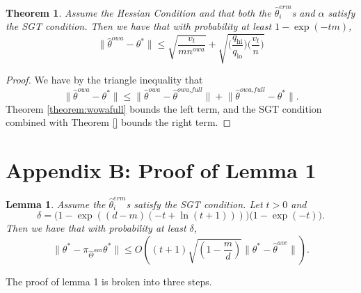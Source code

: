 \documentclass[twoside]{article}
\newtheorem{theorem}{Theorem}
\newtheorem{lemma}{Lemma}
\newcommand{\smin}{s_\text{min}}
\newcommand{\smax}{s_\text{max}}
\newcommand{\qhi}{q_\text{hi}}
\newcommand{\qlo}{q_\text{lo}}
\newcommand{\nowa}{n^{\textit{owa}}}
\newcommand{\W}{{\hat \Theta^{\textit{owa}}}}
\newcommand{\w}{\theta}
\newcommand{\wowa}{\hat\w^{owa}}
\newcommand{\wowafull}{\hat\w^{\textit{owa,full}}}
\newcommand{\wave}{\hat\w^{ave}}
\newcommand{\wmle}{\hat\w^{erm}}
\newcommand{\wstar}{{\w^{*}}}
\newcommand{\I}{\mathcal I}
\newcommand{\ltwo}[1]{{\lVert {#1} \rVert}}
\newcommand{\proj}[1]{\pi_{{#1}}}
\begin{document}
\begin{theorem}
\label{theorem:wowa}
Assume the Hessian Condition and that both the $\wmle_i$s and $\alpha$ satisfy the SGT condition.
Then we have that with probability at least $1-\exp(-tm)$, 
\begin{equation}
\ltwo{\wowa-\wstar} \le 
\sqrt{\frac{v_t}{m\nowa}}
+
\sqrt{\bigg(\frac{\qhi}{\qlo}\bigg)\bigg(\frac{v_t}{n}\bigg)} 
\end{equation}
\end{theorem}

\begin{proof}
We have by the triangle inequality that
\begin{equation}
\ltwo{\wowa-\wstar} \le \ltwo{\wowa-\wowafull} + \ltwo{\wowafull-\wstar}
.
\end{equation}
Theorem \ref{theorem:wowafull} bounds the left term, 
and the SGT condition combined with Theorem \ref{} bounds the right term.
\end{proof}


\clearpage
\section*{Appendix B: Proof of Lemma 1}


\begin{lemma}
\label{lem:proj}
Assume the $\wmle_i$s satisfy the SGT condition.
Let $t>0$ and
\begin{equation}
\delta = 
\big(1-\exp((d-m)(-t+\ln(t+1)))\big)
\big(1-\exp(-t)\big)
.
\label{eq:delta}
\end{equation}
Then we have that with probability at least $\delta$,
\begin{equation}
\ltwo{\wstar-\proj\W\wstar}
\le
O\left(
(t+1)\sqrt{\left(1-\frac{m}{d}\right)}\ltwo{\wstar - \wave}
\right)
.
\end{equation}
\end{lemma}
The proof of lemma 1 is broken into three steps.
\end{document}
